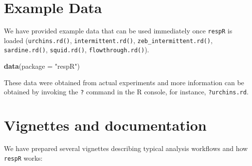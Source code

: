 \documentclass[]{book}
\newenvironment{Shaded}{\begin{snugshade}}{\end{snugshade}}
\newcommand{\KeywordTok}[1]{\textcolor[rgb]{0.13,0.29,0.53}{\textbf{#1}}}
\newcommand{\DataTypeTok}[1]{\textcolor[rgb]{0.13,0.29,0.53}{#1}}
\newcommand{\StringTok}[1]{\textcolor[rgb]{0.31,0.60,0.02}{#1}}
\newcommand{\NormalTok}[1]{#1}
\begin{document}
\section{Example Data}\label{example-data}

We have provided example data that can be used immediately once
\texttt{respR} is loaded (\texttt{urchins.rd()},
\texttt{intermittent.rd()}, \texttt{zeb\_intermittent.rd()},
\texttt{sardine.rd()}, \texttt{squid.rd()}, \texttt{flowthrough.rd()}).

\begin{Shaded}
\begin{Highlighting}[]
\KeywordTok{data}\NormalTok{(}\DataTypeTok{package =} \StringTok{"respR"}\NormalTok{)}
\end{Highlighting}
\end{Shaded}

These data were obtained from actual experiments and more information
can be obtained by invoking the \texttt{?} command in the R console, for
instance, \texttt{?urchins.rd}.

\section{Vignettes and documentation}\label{vignettes-and-documentation}

We have prepared several vignettes describing typical analysis workflows
and how \texttt{respR} works:
\end{document}
